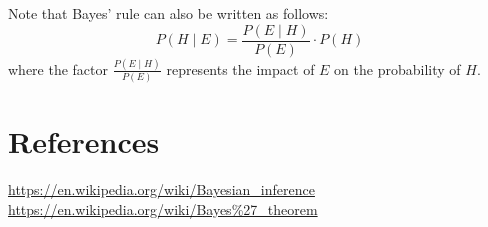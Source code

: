 \documentclass[11pt]{article}
\begin{document}

\noindent
Note that Bayes' rule can also be written as follows:
\begin{equation}
P(H\mid E)={\frac {P(E\mid H)}{P(E)}}\cdot P(H)
\end{equation}
where the factor $\frac {P(E\mid H)}{P(E)}$ represents the impact of
$E$ on the probability of $H$.









\newpage
\section{References}
\href{https://en.wikipedia.org/wiki/Bayesian\_inference}{https://en.wikipedia.org/wiki/Bayesian\_inference}\\
\href{hrefhttps://en.wikipedia.org/wiki/Bayes\%27\_theorem}{https://en.wikipedia.org/wiki/Bayes\%27\_theorem}\\

\citet{Croom04}



\end{document}
